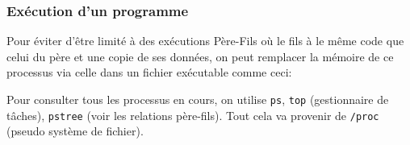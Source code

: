 \subsubsection{Exécution d'un
programme}\label{exuxe9cution-dun-programme}

Pour éviter d'être limité à des exécutions Père-Fils où le fils à le
même code que celui du père et une copie de ses données, on peut
remplacer la mémoire de ce processus via celle dans un fichier
exécutable comme ceci:

\begin{Shaded}
\begin{Highlighting}[]
\PreprocessorTok{ }

\OperatorTok{(}  \OperatorTok{*}\OperatorTok{,}  \OperatorTok{*}\OperatorTok{[],}  \OperatorTok{*}\OperatorTok{[]);}
\end{Highlighting}
\end{Shaded}

Pour consulter tous les processus en cours, on utilise \texttt{ps},
\texttt{top} (gestionnaire de tâches), \texttt{pstree} (voir les
relations père-fils). Tout cela va provenir de \texttt{/proc} (pseudo
système de fichier).

